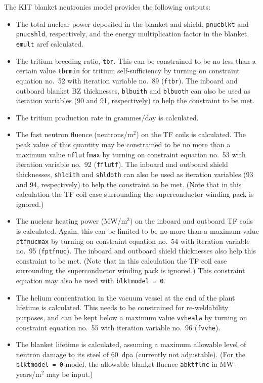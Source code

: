 \documentclass[11pt,a4paper]{report}
\begin{document}
The KIT blanket neutronics model provides the following outputs:
\begin{itemize}

\item The total nuclear power deposited in the blanket and shield,
  \texttt{pnucblkt} and \texttt{pnucshld}, respectively, and the energy
  multiplication factor in the blanket, \texttt{emult} aref calculated.

\item The tritium breeding ratio, \texttt{tbr}. This can be constrained to be
  no less than a certain value \texttt{tbrmin} for tritium self-sufficiency by
  turning on constraint equation no.\ 52 with iteration variable no.\ 89
  (\texttt{ftbr}). The inboard and outboard blanket BZ thicknesses,
  \texttt{blbuith} and \texttt{blbuoth} can also be used as iteration
  variables (90 and 91, respectively) to help the constraint to be met.

\item The tritium production rate in grammes/day is calculated.

\item The fast neutron fluence (neutrons/m$^2$) on the TF coils is
  calculated. The peak value of this quantity may be constrained to be no more
  than a maximum value \texttt{nflutfmax} by turning on constraint equation
  no.\ 53 with iteration variable no.\ 92 (\texttt{fflutf}). The inboard and
  outboard shield thicknesses, \texttt{shldith} and \texttt{shldoth} can also
  be used as iteration variables (93 and 94, respectively) to help the
  constraint to be met. (Note that in this calculation the TF coil case
  surrounding the superconductor winding pack is ignored.)

\item The nuclear heating power (MW/m$^3$) on the inboard and outboard TF
  coils is calculated. Again, this can be limited to be no more than a maximum
  value \texttt{ptfnucmax} by turning on constraint equation no.\ 54 with
  iteration variable no.\ 95 (\texttt{fptfnuc}). The inboard and outboard
  shield thicknesses also help this constraint to be met.  (Note that in this
  calculation the TF coil case surrounding the superconductor winding pack is
  ignored.) This constraint equation may also be used with \texttt{blktmodel =
    0}.

\item The helium concentration in the vacuum vessel at the end of the plant
  lifetime is calculated. This needs to be constrained for re-weldability
  purposes, and can be kept below a maximum value \texttt{vvhealw} by turning
  on constraint equation no.\ 55 with iteration variable no.\ 96
  (\texttt{fvvhe}).

\item The blanket lifetime is calculated, assuming a maximum allowable level
  of neutron damage to its steel of 60~dpa (currently not adjustable). (For
  the \texttt{blktmodel = 0} model, the allowable blanket fluence
  \texttt{abktflnc} in MW-years/m$^2$ may be input.)

\end{itemize}
\end{document}
